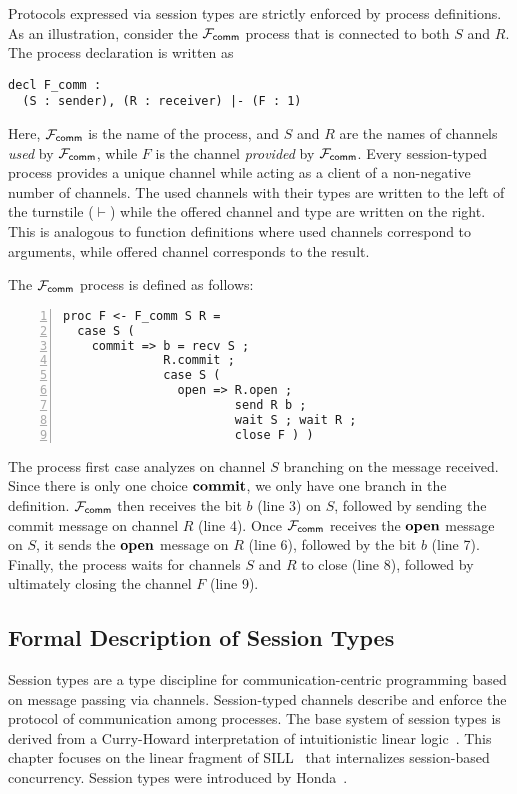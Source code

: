 Protocols expressed via session types are strictly enforced by
process definitions.
As an illustration, consider the $\mathcal{F}_{{\mathsf {comm}}}$ process that is connected
to both $S$ and $R$.
The process declaration is written as
\begin{lstlisting}[basicstyle=\small\ttfamily]
decl F_comm :
  (S : sender), (R : receiver) |- (F : 1)
\end{lstlisting}
Here, $\mathcal{F}_{{\mathsf {comm}}}$ is the name of the process, and $S$ and $R$ are the names
of channels \emph{used} by $\mathcal{F}_{{\mathsf {comm}}}$, while $F$ is the channel \emph{provided}
by $\mathcal{F}_{{\mathsf {comm}}}$.
Every session-typed process provides a unique channel while acting as a client
of a non-negative number of channels.
The used channels with their types are written to the left of the turnstile
($\vdash$) while the offered channel and type are written on the right.
This is analogous to function definitions where used channels correspond to
arguments, while offered channel corresponds to the result.

The $\mathcal{F}_{{\mathsf {comm}}}$ process is defined as follows:
\begin{lstlisting}[basicstyle=\small\ttfamily, numbers=left,xleftmargin=2em]
proc F <- F_comm S R =
  case S (
    commit => b = recv S ;
              R.commit ;
              case S (
                open => R.open ;
                        send R b ;
                        wait S ; wait R ;
                        close F ) )
\end{lstlisting}
The process first case analyzes on channel $S$ branching on the
message received.
Since there is only one choice $\mathbf{commit}$, we only have one
branch in the definition.
$\mathcal{F}_{{\mathsf {comm}}}$ then receives the bit $b$ (line 3) on $S$, followed by sending the
commit message on channel $R$ (line 4).
Once $\mathcal{F}_{{\mathsf {comm}}}$ receives the $\mathbf{open}$ message on $S$, it sends the
$\mathbf{open}$ message on $R$ (line 6), followed by the bit $b$ (line 7).
Finally, the process waits for channels $S$ and $R$ to close (line 8),
followed by ultimately closing the channel $F$ (line 9).

\subsection{Formal Description of Session Types}

Session types are a type discipline for communication-centric programming
based on message passing via channels. Session-typed channels describe and
enforce the protocol of communication among processes. The base system of
session types is derived from a Curry-Howard interpretation of intuitionistic
linear logic~\cite{CairesCONCUR2010}. This chapter focuses on the linear
fragment of SILL~\cite{PfenningFOSSACS2015} that internalizes session-based
concurrency.
Session types were introduced by Honda~\cite{HondaCONCUR1993}.

